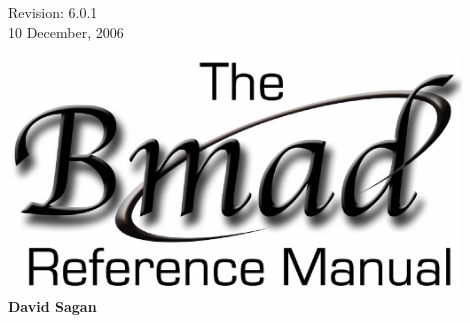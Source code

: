 \thispagestyle{empty}

\begin{flushright}
\large
  Revision: 6.0.1 \\
  10 December, 2006 \\
\end{flushright}

\vfill

{
\begin{center}
\includegraphics[width=12cm]{bmad_ref_manual.eps} \\
\vskip 0.3in
\huge\bf David Sagan
\end{center}
}

\vfill
\break
